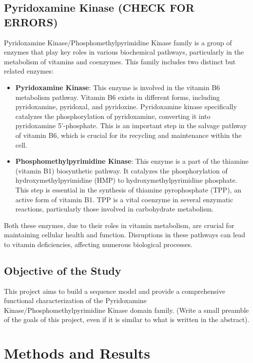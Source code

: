 \documentclass[10pt,twocolumn,letterpaper]{article}
\begin{document}
\subsection{Pyridoxamine Kinase (CHECK FOR ERRORS)}

Pyridoxamine Kinase/Phosphomethylpyrimidine Kinase family is a group of enzymes that play key roles in various biochemical pathways, particularly in the metabolism of vitamins and coenzymes. This family includes two distinct but related enzymes:

\begin{itemize}
\item \textbf{Pyridoxamine Kinase}: This enzyme is involved in the vitamin B6 metabolism pathway. Vitamin B6 exists in different forms, including pyridoxamine, pyridoxal, and pyridoxine. Pyridoxamine kinase specifically catalyzes the phosphorylation of pyridoxamine, converting it into pyridoxamine 5'-phosphate. This is an important step in the salvage pathway of vitamin B6, which is crucial for its recycling and maintenance within the cell.

\item \textbf{Phosphomethylpyrimidine Kinase}: This enzyme is a part of the thiamine (vitamin B1) biosynthetic pathway. It catalyzes the phosphorylation of hydroxymethylpyrimidine (HMP) to hydroxymethylpyrimidine phosphate. This step is essential in the synthesis of thiamine pyrophosphate (TPP), an active form of vitamin B1. TPP is a vital coenzyme in several enzymatic reactions, particularly those involved in carbohydrate metabolism.
\end{itemize}

Both these enzymes, due to their roles in vitamin metabolism, are crucial for maintaining cellular health and function. Disruptions in these pathways can lead to vitamin deficiencies, affecting numerous biological processes.

\subsection{Objective of the Study}

This project aims to build a sequence model and provide a comprehensive functional characterization of the Pyridoxamine Kinase/Phosphomethylpyrimidine Kinase domain family. (Write a small preamble of the goals of this project, even if it is similar to what is written in the abstract).

\section{Methods and Results}
\end{document}
